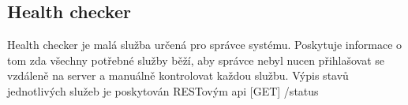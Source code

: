 
\subsection{Health checker}\label{subsec:health-checker}
Health checker je malá služba určená pro správce systému.\newline
Poskytuje informace o tom zda všechny potřebné služby běží, aby správce nebyl nucen přihlašovat se vzdáleně na server a manuálně kontrolovat každou službu.
Výpis stavů jednotlivých služeb je poskytován RESTovým api [GET] /status
